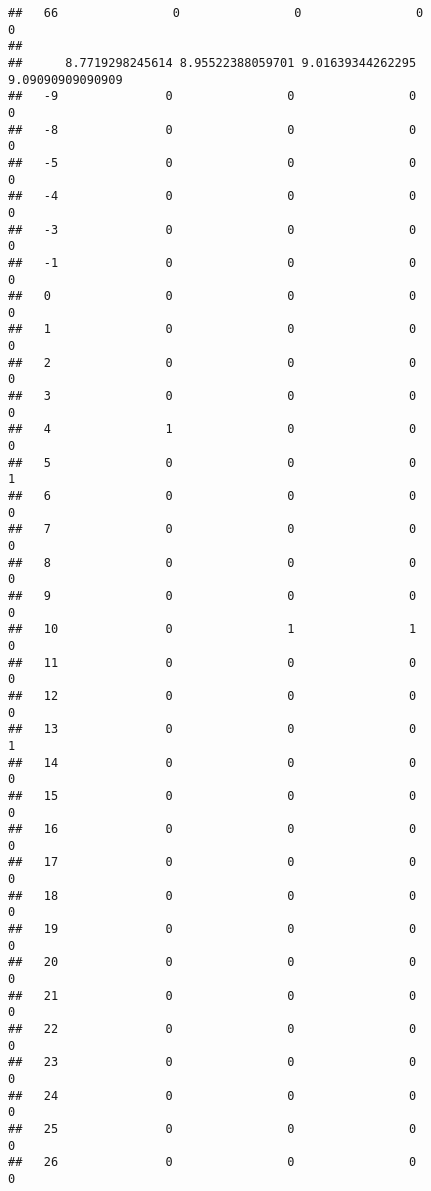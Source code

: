 \documentclass[]{article}
\begin{document}
\begin{verbatim}
##   66                0                0                0                0
##     
##      8.7719298245614 8.95522388059701 9.01639344262295 9.09090909090909
##   -9               0                0                0                0
##   -8               0                0                0                0
##   -5               0                0                0                0
##   -4               0                0                0                0
##   -3               0                0                0                0
##   -1               0                0                0                0
##   0                0                0                0                0
##   1                0                0                0                0
##   2                0                0                0                0
##   3                0                0                0                0
##   4                1                0                0                0
##   5                0                0                0                1
##   6                0                0                0                0
##   7                0                0                0                0
##   8                0                0                0                0
##   9                0                0                0                0
##   10               0                1                1                0
##   11               0                0                0                0
##   12               0                0                0                0
##   13               0                0                0                1
##   14               0                0                0                0
##   15               0                0                0                0
##   16               0                0                0                0
##   17               0                0                0                0
##   18               0                0                0                0
##   19               0                0                0                0
##   20               0                0                0                0
##   21               0                0                0                0
##   22               0                0                0                0
##   23               0                0                0                0
##   24               0                0                0                0
##   25               0                0                0                0
##   26               0                0                0                0

\end{verbatim}
\end{document}

